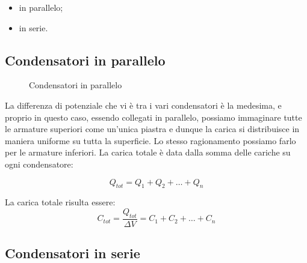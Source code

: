 \begin{itemize}
    \item in parallelo;
    \item in serie.
\end{itemize}

\subsection{Condensatori in parallelo}

\begin{figure}[H]
    \centering
    \caption{Condensatori in parallelo}
    \label{fig:condParallelo}
\end{figure}


La differenza di potenziale che vi è tra i vari condensatori è la medesima, e proprio in questo caso, essendo collegati in parallelo, possiamo immaginare tutte le armature superiori come un'unica piastra e dunque la carica si distribuisce in maniera uniforme su tutta la superficie. Lo stesso ragionamento possiamo farlo per le armature inferiori.
La carica totale è data dalla somma delle cariche su ogni condensatore:

\begin{equation*}
    Q_{tot} = Q_1 + Q_2 + \dots + Q_n
\end{equation*}

La carica totale risulta essere:
\begin{equation}
    C_{tot} = \frac{Q_{tot}}{\Delta V} = C_1 + C_2 + \dots + C_n
\end{equation}


\subsection{Condensatori in serie}

